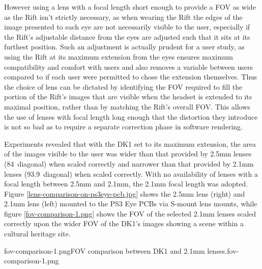 However using a lens with a focal length short enough to provide a FOV as wide as the Rift isn't strictly necessary, as when wearing the Rift the edges of the image presented to each eye are not necessarily visible to the user, especially if the Rift's adjustable distance from the eyes are adjusted such that it sits at its furthest position. Such an adjustment is actually prudent for a user study, as using the Rift at its maximum extension from the eyes ensures maximum compatibility and comfort with users and also removes a variable between users compared to if each user were permitted to chose the extension themselves. Thus the choice of lens can be dictated by identifying the FOV required to fill the portion of the Rift's images that are visible when the headset is extended to its maximal position, rather than by matching the Rift's overall FOV. This allows the use of lenses with focal length long enough that the distortion they introduce is not so bad as to require a separate correction phase in software rendering.

Experiments revealed that with the DK1 set to its maximum extension, the area of the images visible to the user was wider than that provided by 2.5mm lenses (84\textdegree\ diagonal) when scaled correctly and narrower than that provided by 2.1mm lenses (93.9\textdegree\ diagonal) when scaled correctly. With no availability of lenses with a focal length between 2.5mm and 2.1mm, the 2.1mm focal length was adopted. Figure \ref{lens-comparison-on-ps3eye-pcb.jpg} shows the 2.5mm lens (right) and 2.1mm lens (left) mounted to the PS3 Eye PCBs via S-mount lens mounts, while figure \ref{fov-comparison-1.png} shows the FOV of the selected 2.1mm lenses scaled correctly upon the wider FOV of the DK1's images showing a scene within a cultural heritage site.

       {fov-comparison-1.png}{FOV comparison between DK1 and 2.1mm lenses.}{fov-comparison-1.png}


